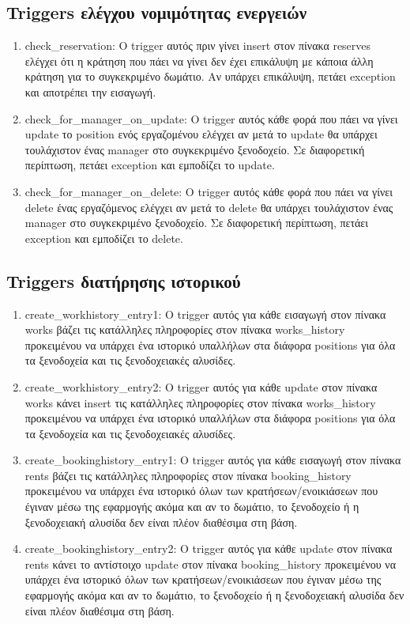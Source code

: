 \documentclass[a4paper,oneside, 11pt]{article}
\begin{document}
\subsection{Triggers ελέγχου νομιμότητας ενεργειών}
\begin{enumerate}
\item check\_reservation: O trigger αυτός πριν γίνει insert στον πίνακα reserves ελέγχει ότι η κράτηση που πάει να γίνει δεν έχει επικάλυψη με κάποια άλλη κράτηση για το συγκεκριμένο δωμάτιο. Αν υπάρχει επικάλυψη, πετάει exception και αποτρέπει την εισαγωγή.
\item check\_for\_manager\_on\_update: Ο trigger αυτός κάθε φορά που πάει να γίνει update το position ενός εργαζομένου ελέγχει αν μετά το update θα υπάρχει τουλάχιστον ένας manager στο συγκεκριμένο ξενοδοχείο. Σε διαφορετική περίπτωση, πετάει exception και εμποδίζει το update.

\item check\_for\_manager\_on\_delete: Ο trigger αυτός κάθε φορά που πάει να γίνει delete ένας εργαζόμενος ελέγχει αν μετά το delete θα υπάρχει τουλάχιστον ένας manager στο συγκεκριμένο ξενοδοχείο. Σε διαφορετική περίπτωση, πετάει exception και εμποδίζει το delete.


\end{enumerate}

\subsection{Triggers διατήρησης ιστορικού}

\begin{enumerate}
\item create\_workhistory\_entry1: O trigger αυτός για κάθε εισαγωγή στον πίνακα works βάζει τις κατάλληλες πληροφορίες στον πίνακα works\_history προκειμένου να υπάρχει ένα ιστορικό υπαλλήλων στα διάφορα positions για όλα τα ξενοδοχεία και τις ξενοδοχειακές αλυσίδες.

\item create\_workhistory\_entry2: Ο trigger αυτός για κάθε update στον πίνακα works κάνει insert τις κατάλληλες πληροφορίες στον πίνακα works\_history προκειμένου να υπάρχει ένα ιστορικό υπαλλήλων στα διάφορα positions για όλα τα ξενοδοχεία και τις ξενοδοχειακές αλυσίδες.

\item create\_bookinghistory\_entry1: Ο trigger αυτός για κάθε εισαγωγή στον πίνακα rents βάζει τις κατάλληλες πληροφορίες στον πίνακα booking\_history προκειμένου να υπάρχει ένα ιστορικό όλων των κρατήσεων/ενοικιάσεων που έγιναν μέσω της εφαρμογής ακόμα και αν το δωμάτιο, το ξενοδοχείο ή η ξενοδοχειακή αλυσίδα δεν είναι πλέον διαθέσιμα στη βάση.

\item create\_bookinghistory\_entry2: Ο trigger αυτός για κάθε update στον πίνακα rents κάνει το αντίστοιχο update στον πίνακα booking\_history προκειμένου να υπάρχει ένα ιστορικό όλων των κρατήσεων/ενοικιάσεων που έγιναν μέσω της εφαρμογής ακόμα και αν το δωμάτιο, το ξενοδοχείο ή η ξενοδοχειακή αλυσίδα δεν είναι πλέον διαθέσιμα στη βάση.
\end{enumerate}
\end{document}
